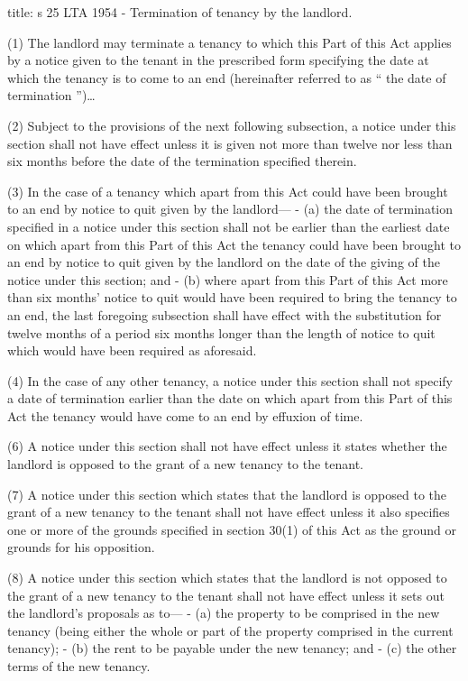 \documentclass[
]{article}
\newenvironment{Shaded}{}{}
\newcommand{\NormalTok}[1]{#1}
\begin{document}
\begin{Shaded}
\begin{Highlighting}[]
\NormalTok{title: s 25 LTA 1954 {-} Termination of tenancy by the landlord.}

\NormalTok{(1) The landlord may terminate a tenancy to which this Part of this Act applies by a notice given to the tenant in the prescribed form specifying the date at which the tenancy is to come to an end (hereinafter referred to as “ the date of termination ”)…}

\NormalTok{(2) Subject to the provisions of the next following subsection, a notice under this section shall not have effect unless it is given not more than twelve nor less than six months before the date of the termination specified therein.}

\NormalTok{(3) In the case of a tenancy which apart from this Act could have been brought to an end by notice to quit given by the landlord—}
\NormalTok{{-} (a) the date of termination specified in a notice under this section shall not be earlier than the earliest date on which apart from this Part of this Act the tenancy could have been brought to an end by notice to quit given by the landlord on the date of the giving of the notice under this section; and}
\NormalTok{{-} (b) where apart from this Part of this Act more than six months’ notice to quit would have been required to bring the tenancy to an end, the last foregoing subsection shall have effect with the substitution for twelve months of a period six months longer than the length of notice to quit which would have been required as aforesaid.}

\NormalTok{(4) In the case of any other tenancy, a notice under this section shall not specify a date of termination earlier than the date on which apart from this Part of this Act the tenancy would have come to an end by effuxion of time.}

\NormalTok{(6) A notice under this section shall not have effect unless it states whether the landlord is opposed to the grant of a new tenancy to the tenant.}

\NormalTok{(7) A notice under this section which states that the landlord is opposed to the grant of a new tenancy to the tenant shall not have effect unless it also specifies one or more of the grounds specified in section 30(1) of this Act as the ground or grounds for his opposition.}

\NormalTok{(8) A notice under this section which states that the landlord is not opposed to the grant of a new tenancy to the tenant shall not have effect unless it sets out the landlord’s proposals as to—}
\NormalTok{{-} (a) the property to be comprised in the new tenancy (being either the whole or part of the property comprised in the current tenancy);}
\NormalTok{{-} (b) the rent to be payable under the new tenancy; and}
\NormalTok{{-} (c) the other terms of the new tenancy.}
\end{Highlighting}
\end{Shaded}
\end{document}
